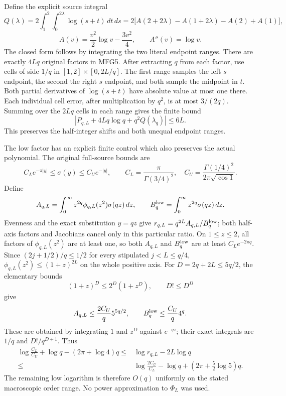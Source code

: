 \documentclass[11pt,a4paper]{article}
\begin{document}
Define the explicit source integral
\[
 Q(\lambda)=2\int_1^2\int_0^{2\lambda}\log(s+t)\,dt\,ds
 =2\big[A(2+2\lambda)-A(1+2\lambda)-A(2)+A(1)\big],
\]
\[
 A(v)=\frac{v^2}{2}\log v-\frac{3v^2}{4},\qquad A''(v)=\log v.
 \tag{MFG20}
\]
The closed form follows by integrating the two literal endpoint ranges.
There are exactly $4Lq$ original factors in MFG5. After extracting
$q$ from each factor, use cells of side $1/q$ in
$[1,2]\times[0,2L/q]$. The first range samples the left $s$ endpoint,
the second the right $s$ endpoint, and both sample the midpoint in $t$.
Both partial derivatives of $\log(s+t)$ have absolute value at most
one there. Each individual cell error, after multiplication by $q^2$,
is at most $3/(2q)$. Summing over the $2Lq$ cells in each range gives
the finite bound
\[
 \boxed{\left|P_{q,L}+4Lq\log q+q^2Q(\lambda_q)\right|\le6L.}
 \tag{MFG21}
\]
This preserves the half-integer shifts and both unequal endpoint ranges.

The low factor has an explicit finite control which also preserves
the actual polynomial. The original full-source bounds are
\[
 C_Le^{-\pi|y|}\le\sigma(y)\le C_Ue^{-|y|},\qquad
 C_L=\frac{\pi}{\Gamma(3/4)^2},\quad
 C_U=\frac{\Gamma(1/4)^2}{2\pi\sqrt{\cos1}}.
\]
Define
\[
 A_{q,L}=\int_0^\infty z^{2q}\phi_{q,L}(z^2)\sigma(qz)\,dz,
 \qquad B_q^{\rm low}=\int_0^\infty z^{2q}\sigma(qz)\,dz.
\]
Evenness and the exact substitution $y=qz$ give
$r_{q,L}=q^{2L}A_{q,L}/B_q^{\rm low}$; both half-axis factors and
Jacobians cancel only in this particular ratio.
On $1\le z\le2$, all factors of $\phi_{q,L}(z^2)$ are at least one,
so both $A_{q,L}$ and $B_q^{\rm low}$ are at least $C_Le^{-2\pi q}$.
Since $(2j+1/2)/q\le1/2$ for every stipulated $j<L\le q/4$,
$\phi_{q,L}(z^2)\le(1+z)^{2L}$ on the whole positive axis.
For $D=2q+2L\le5q/2$, the elementary bounds
\[
 (1+z)^D\le2^D(1+z^D),\qquad D!\le D^D
\]
give
\[
 A_{q,L}\le\frac{2C_U}{q}5^{5q/2},\qquad
 B_q^{\rm low}\le\frac{C_U}{q}4^q.
\]
These are obtained by integrating $1$ and $z^D$ against $e^{-qz}$;
their exact integrals are $1/q$ and $D!/q^{D+1}$. Thus
\[
 \boxed{\begin{aligned}
 \log\frac{C_L}{C_U}+\log q-(2\pi+\log4)q
 \le{}&\log r_{q,L}-2L\log q\\
 \le{}&\log\frac{2C_U}{C_L}-\log q
                      +(2\pi+\tfrac52\log5)q.
 \end{aligned}}
 \tag{MFG22}
\]
The remaining low logarithm is therefore $O(q)$ uniformly on the stated
macroscopic order range. No power approximation to $\Phi_L$ was used.
\end{document}
